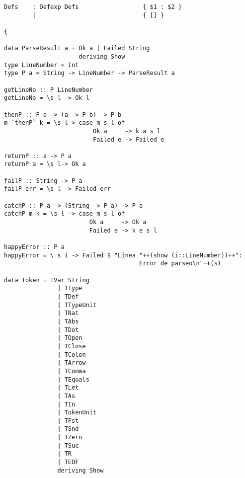 \documentclass[12pt, a4paper]{article}
\begin{document}
\begin{Verbatim}
Defs    : Defexp Defs                  { $1 : $2 }
        |                              { [] }
     
{

data ParseResult a = Ok a | Failed String
                     deriving Show                     
type LineNumber = Int
type P a = String -> LineNumber -> ParseResult a

getLineNo :: P LineNumber
getLineNo = \s l -> Ok l

thenP :: P a -> (a -> P b) -> P b
m `thenP` k = \s l-> case m s l of
                         Ok a     -> k a s l
                         Failed e -> Failed e
                         
returnP :: a -> P a
returnP a = \s l-> Ok a

failP :: String -> P a
failP err = \s l -> Failed err

catchP :: P a -> (String -> P a) -> P a
catchP m k = \s l -> case m s l of
                        Ok a     -> Ok a
                        Failed e -> k e s l

happyError :: P a
happyError = \ s i -> Failed $ "Línea "++(show (i::LineNumber))++":
					                  Error de parseo\n"++(s)

data Token = TVar String
               | TType
               | TDef
               | TTypeUnit
               | TNat
               | TAbs
               | TDot
               | TOpen
               | TClose 
               | TColon
               | TArrow
               | TComma
               | TEquals
               | TLet
               | TAs
               | TIn
               | TokenUnit
               | TFst
               | TSnd
               | TZero
               | TSuc
               | TR
               | TEOF
               deriving Show


\end{Verbatim}
\end{document}

